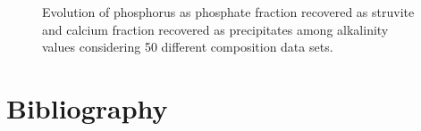 \begin{refsection}[referencesCh3]
\begin{figure}[h]
	\caption{Evolution of phosphorus as phosphate fraction recovered as struvite and calcium fraction recovered as precipitates among alkalinity values considering 50 different composition data sets.}
	\label{fig:estimation_Alk}
\end{figure}

\newpage

\section*{Bibliography}

\printbibliography[heading=none]
\end{refsection}


